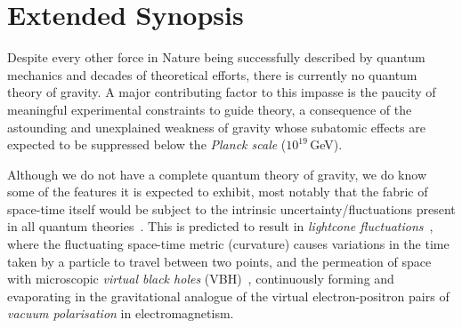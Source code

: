 \documentclass[a4paper,11pt]{article}
\begin{document}
\newpage

\section{Extended Synopsis}
\vspace{0.1 cm}



Despite every other force in Nature being successfully described by quantum mechanics and decades of theoretical efforts, there is currently no quantum theory of gravity. A major contributing factor to this impasse is the paucity of meaningful experimental constraints to guide theory, a consequence of the astounding and unexplained weakness of gravity whose subatomic effects are expected to be suppressed below the \textit{Planck scale} ($10^{19}$\,GeV).


Although we do not have a complete quantum theory of gravity, we do know some of the features it is expected to exhibit, most notably that the fabric of space-time itself would be subject to the intrinsic uncertainty/fluctuations present in all quantum theories~\cite{PhysRev.97.511, Hawking}. This is predicted to result in \textit{lightcone fluctuations}~\cite{PauliLightcone, Ford1999, gr-qc/9909085, Ellis:1999jf}, where the fluctuating space-time metric (curvature) causes variations in the time taken by a particle to travel between two points, and the permeation of space with microscopic \textit{virtual black holes} (VBH)~\cite{Hawking1982,PhysRevD.53.3099}, continuously forming and evaporating in the gravitational analogue of the virtual electron-positron pairs of \textit{vacuum polarisation} in electromagnetism. 
\end{document}
